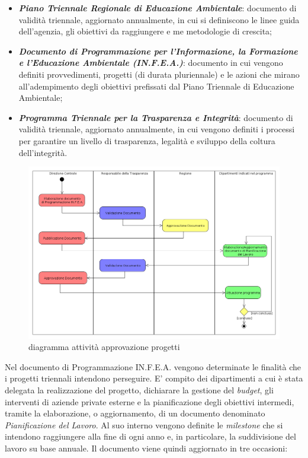 \begin{itemize}
	\item \textbf{\textit{Piano Triennale Regionale di Educazione Ambientale}}: documento di validità triennale, aggiornato annualmente, in cui si definiscono le linee guida dell'agenzia, gli obiettivi da raggiungere e me metodologie di crescita;
	\item \textbf{\textit{Documento di Programmazione per l'Informazione, la Formazione e l'Educazione Ambientale (IN.F.E.A.)}}: documento in cui vengono definiti provvedimenti, progetti (di durata pluriennale) e le azioni che mirano all'adempimento degli obiettivi prefissati dal Piano Triennale di Educazione Ambientale;
	\item \textbf{\textit{Programma Triennale per la Trasparenza e Integrità}}: documento di validità triennale, aggiornato annualmente, in cui vengono definiti i processi per garantire un livello di trasparenza, legalità e sviluppo della coltura dell'integrità.
	
	
\end{itemize}

\begin{figure}[htpb]
\includegraphics[scale=0.33]{./capitoli/capitolo1/img/attivita_programma}
\caption{diagramma attività approvazione progetti}
\end{figure}

Nel documento di Programmazione IN.F.E.A. vengono determinate le finalità che i progetti triennali intendono perseguire. E' compito dei dipartimenti a cui è stata delegata la realizzazione del progetto, dichiarare la gestione del \textit{budget}, gli interventi di aziende private esterne e la pianificazione degli obiettivi intermedi, tramite la elaborazione, o aggiornamento, di un documento denominato \textit{Pianificazione del Lavoro}. Al suo interno vengono definite le \textit{milestone} che si intendono raggiungere alla fine di ogni anno e, in particolare, la suddivisione del lavoro su base annuale. Il documento viene quindi aggiornato in tre occasioni:

